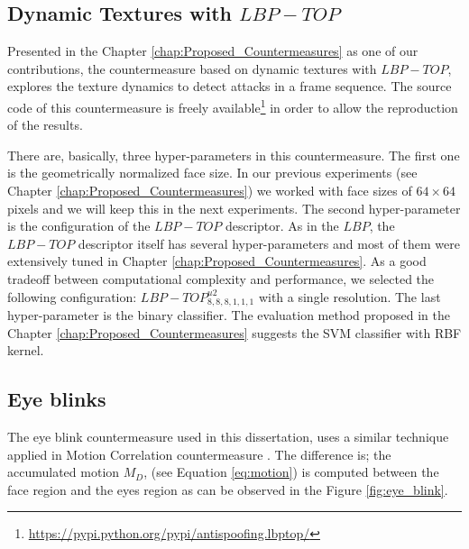 \subsection{Dynamic Textures with $LBP-TOP$}

Presented in the Chapter \ref{chap:Proposed_Countermeasures} as one of our contributions, the countermeasure based on dynamic textures with $LBP-TOP$, explores the texture dynamics to detect attacks in a frame sequence. The source code of this countermeasure is freely available\footnote{\url{https://pypi.python.org/pypi/antispoofing.lbptop/}} in order to allow the reproduction of the results.

There are, basically, three hyper-parameters in this countermeasure. The first one is the geometrically normalized face size. In our previous experiments (see Chapter \ref{chap:Proposed_Countermeasures}) we worked with face sizes of $64 \times 64$ pixels and we will keep this in the next experiments. The second hyper-parameter is the configuration of the $LBP-TOP$ descriptor. As in the $LBP$, the $LBP-TOP$ descriptor itself has several hyper-parameters and most of them were extensively tuned in Chapter \ref{chap:Proposed_Countermeasures}. As a good tradeoff between computational complexity and performance, we selected the following configuration: $LBP-TOP^{u2}_{8,8,8,1,1,1}$ with a single resolution. The last hyper-parameter is the binary classifier. The evaluation method proposed in the Chapter \ref{chap:Proposed_Countermeasures} suggests the SVM classifier with RBF kernel.


\subsection{Eye blinks}

The eye blink countermeasure used in this dissertation, uses a similar technique applied in Motion Correlation countermeasure \citep{AnjosIJCB2011}. The difference is; the accumulated motion $M_D$, (see Equation \ref{eq:motion}) is computed between the face region and the eyes region as can be observed in the Figure \ref{fig:eye_blink}. 

